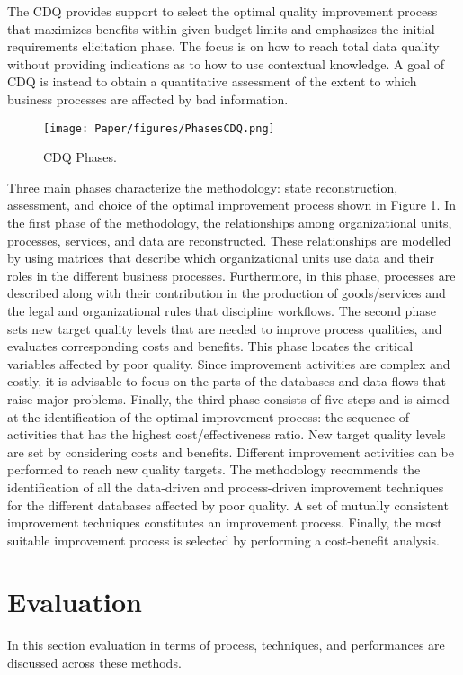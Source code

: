 \documentclass[pdftex,english,oribibl]{llncs}
\begin{document}
The CDQ provides support to select the optimal quality improvement process that maximizes benefits within given budget limits and emphasizes the initial requirements elicitation phase.
The focus is on how to reach total data quality without providing indications as to how to use contextual knowledge. A goal of CDQ is instead to obtain a quantitative assessment of the extent to which business processes are affected by bad information.

\begin{figure}
    \centering
    \texttt{[image: Paper/figures/PhasesCDQ.png]}
    \caption{CDQ Phases.}
    \label{fig:PhasesCDQ}
 \end{figure}

Three main phases characterize the methodology: state reconstruction, assessment, and choice of the optimal improvement process shown in Figure \ref{fig:PhasesCDQ}.
In the first phase of the methodology, the relationships among organizational units, processes, services, and data are reconstructed.
These relationships are modelled by using matrices that describe which organizational units use data and their roles in the different business processes.
Furthermore, in this phase, processes are described along with their contribution in the production of goods/services and the legal and organizational rules that discipline workflows.
The second phase sets new target quality levels that are needed to improve process qualities, and evaluates corresponding costs and benefits.
This phase locates the critical variables affected by poor quality. Since improvement activities are complex and costly, it is advisable to focus on the parts of the databases and data flows that raise major problems.
Finally, the third phase consists of five steps and is aimed at the identification of the optimal improvement process: the sequence of activities that has the highest cost/effectiveness ratio.
New target quality levels are set by considering costs and benefits. Different improvement activities can be performed to reach new quality targets.
The methodology recommends the identification of all the data-driven and process-driven improvement techniques for the different databases affected by poor quality.
A set of mutually consistent improvement techniques constitutes an improvement process.
Finally, the most suitable improvement process is selected by performing a cost-benefit analysis.


\section{Evaluation}
In this section evaluation in terms of process, techniques, and performances are discussed across these methods.
\end{document}
